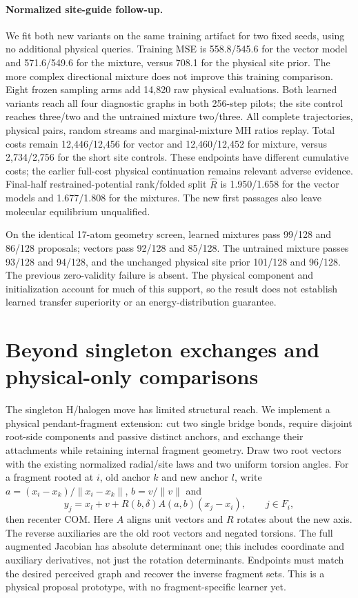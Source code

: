 \paragraph{Normalized site-guide follow-up.}
We fit both new variants on the same training artifact for two fixed seeds,
using no additional physical queries. Training MSE is 558.8/545.6 for the vector
model and 571.6/549.6 for the mixture, versus 708.1 for the physical site prior.
The more complex directional mixture does not improve this training comparison.
Eight frozen sampling arms add 14,820 raw physical evaluations. Both learned
variants reach all four diagnostic graphs in both 256-step pilots; the site
control reaches three/two and the untrained mixture two/three. All complete
trajectories, physical pairs, random streams and marginal-mixture MH ratios replay.
Total costs remain 12,446/12,456 for vector and 12,460/12,452 for mixture, versus
2,734/2,756 for the short site controls. These endpoints have different cumulative
costs; the earlier full-cost physical continuation remains relevant adverse evidence.
Final-half restrained-potential rank/folded split $\widehat R$ is 1.950/1.658 for
the vector models and 1.677/1.808 for the mixtures. The new first passages also
leave molecular equilibrium unqualified.

On the identical 17-atom geometry screen, learned mixtures pass 99/128 and 86/128
proposals; vectors pass 92/128 and 85/128. The untrained mixture passes 93/128 and
94/128, and the unchanged physical site prior 101/128 and 96/128. The previous
zero-validity failure is absent. The physical component and initialization account
for much of this support, so the result does not establish learned transfer
superiority or an energy-distribution guarantee.

\section{Beyond singleton exchanges and physical-only comparisons}
The singleton H/halogen move has limited structural reach. We implement a
physical pendant-fragment extension: cut two single bridge bonds, require
disjoint root-side components and passive distinct anchors, and exchange their
attachments while retaining internal fragment geometry. Draw two root vectors
with the existing normalized radial/site laws and two uniform torsion angles.
For a fragment rooted at $i$, old anchor $k$ and new anchor $l$, write
$a=(x_i-x_k)/\|x_i-x_k\|$, $b=v/\|v\|$ and
\begin{equation}
 y_j=x_l+v+R(b,\delta)A(a,b)(x_j-x_i),\qquad j\in F_i,
\end{equation}
then recenter COM. Here $A$ aligns unit vectors and $R$ rotates about the new axis.
The reverse auxiliaries are the old root vectors and negated torsions. The full
augmented Jacobian has absolute determinant one; this includes coordinate and
auxiliary derivatives, not just the rotation determinants. Endpoints must match
the desired perceived graph and recover the inverse fragment sets. This is a
physical proposal prototype, with no fragment-specific learner yet.

